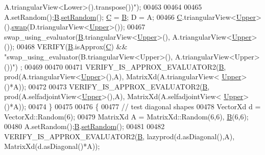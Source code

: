 \begin{DoxyCode}
{       A.triangularView<Lower>().transpose())"});
00463     
00464     
00465     A.setRandom();\hyperlink{group___core___module_class_eigen_1_1_matrix}{B}.\hyperlink{class_eigen_1_1_plain_object_base_af0e576a0e1aefc9ee346de44cc352ba3}{setRandom}(); \hyperlink{group___core___module}{C} = \hyperlink{group___core___module_class_eigen_1_1_matrix}{B}; D = A;
00466     \hyperlink{group___core___module}{C}.triangularView<\hyperlink{group__enums_gga39e3366ff5554d731e7dc8bb642f83cda6bcb58be3b8b8ec84859ce0c5ac0aaec}{Upper}>().\hyperlink{endian_8c_a3ca5ecd34b04d6a243c054ac3a57f68d}{swap}(D.triangularView<\hyperlink{group__enums_gga39e3366ff5554d731e7dc8bb642f83cda6bcb58be3b8b8ec84859ce0c5ac0aaec}{Upper}>());
00467     swap\_using\_evaluator(\hyperlink{group___core___module_class_eigen_1_1_matrix}{B}.triangularView<\hyperlink{group__enums_gga39e3366ff5554d731e7dc8bb642f83cda6bcb58be3b8b8ec84859ce0c5ac0aaec}{Upper}>(), A.triangularView<\hyperlink{group__enums_gga39e3366ff5554d731e7dc8bb642f83cda6bcb58be3b8b8ec84859ce0c5ac0aaec}{Upper}>());
00468     VERIFY(\hyperlink{group___core___module_class_eigen_1_1_matrix}{B}.isApprox(\hyperlink{group___core___module}{C}) && \textcolor{stringliteral}{"swap\_using\_evaluator(B.triangularView<Upper>(), A.triangularView<Upper>())"})
      ;
00469     
00470     
00471     VERIFY\_IS\_APPROX\_EVALUATOR2(\hyperlink{group___core___module_class_eigen_1_1_matrix}{B}, prod(A.triangularView<\hyperlink{group__enums_gga39e3366ff5554d731e7dc8bb642f83cda6bcb58be3b8b8ec84859ce0c5ac0aaec}{Upper}>(),A), MatrixXd(A.triangularView<
      \hyperlink{group__enums_gga39e3366ff5554d731e7dc8bb642f83cda6bcb58be3b8b8ec84859ce0c5ac0aaec}{Upper}>()*A));
00472     
00473     VERIFY\_IS\_APPROX\_EVALUATOR2(\hyperlink{group___core___module_class_eigen_1_1_matrix}{B}, prod(A.selfadjointView<\hyperlink{group__enums_gga39e3366ff5554d731e7dc8bb642f83cda6bcb58be3b8b8ec84859ce0c5ac0aaec}{Upper}>(),A), MatrixXd(A.selfadjointView<
      \hyperlink{group__enums_gga39e3366ff5554d731e7dc8bb642f83cda6bcb58be3b8b8ec84859ce0c5ac0aaec}{Upper}>()*A));
00474   \}
00475 
00476   \{
00477     \textcolor{comment}{// test diagonal shapes}
00478     VectorXd d = VectorXd::Random(6);
00479     MatrixXd A = MatrixXd::Random(6,6), \hyperlink{group___core___module_class_eigen_1_1_matrix}{B}(6,6);
00480     A.setRandom();\hyperlink{group___core___module_class_eigen_1_1_matrix}{B}.\hyperlink{class_eigen_1_1_plain_object_base_af0e576a0e1aefc9ee346de44cc352ba3}{setRandom}();
00481     
00482     VERIFY\_IS\_APPROX\_EVALUATOR2(\hyperlink{group___core___module_class_eigen_1_1_matrix}{B}, lazyprod(d.asDiagonal(),A), MatrixXd(d.asDiagonal()*A));

\end{DoxyCode}
